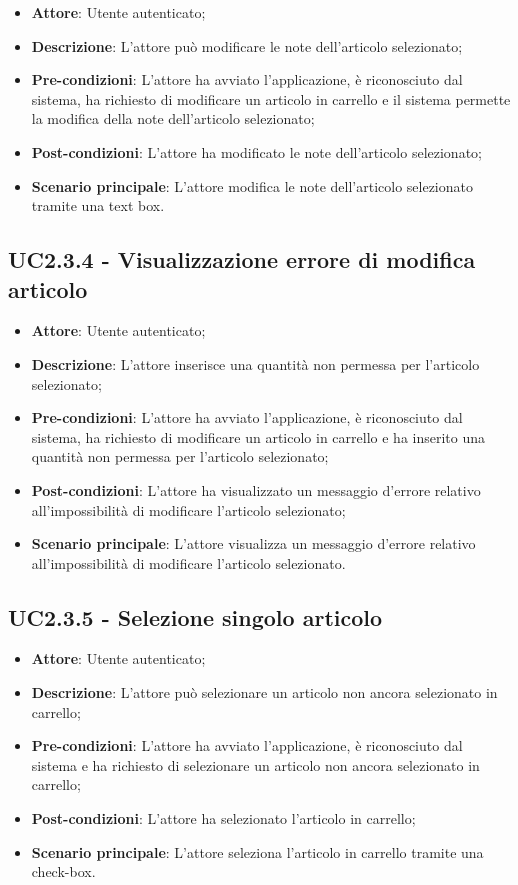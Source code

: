 \begin{itemize}
	\item \textbf{Attore}: Utente autenticato;
	\item \textbf{Descrizione}: L'attore può modificare le note dell'articolo selezionato;
	\item \textbf{Pre-condizioni}: L'attore ha avviato l'applicazione, è riconosciuto dal sistema, ha richiesto di modificare un articolo in carrello e il sistema permette la modifica della note dell'articolo selezionato;
	\item \textbf{Post-condizioni}: L'attore ha modificato le note dell'articolo selezionato;
	\item \textbf{Scenario principale}: L'attore modifica le note dell'articolo selezionato tramite una text box.
\end{itemize}

\subsection{UC2.3.4 - Visualizzazione errore di modifica articolo}

\begin{itemize}
	\item \textbf{Attore}: Utente autenticato;
	\item \textbf{Descrizione}: L'attore inserisce una quantità non permessa per l'articolo selezionato;
	\item \textbf{Pre-condizioni}: L'attore ha avviato l'applicazione, è riconosciuto dal sistema, ha richiesto di modificare un articolo in carrello e ha inserito una quantità non permessa per l'articolo selezionato;
	\item \textbf{Post-condizioni}: L'attore ha visualizzato un messaggio d'errore relativo all'impossibilità di modificare l'articolo selezionato;
	\item \textbf{Scenario principale}: L'attore visualizza un messaggio d'errore relativo all'impossibilità di modificare l'articolo selezionato.
\end{itemize}

\subsection{UC2.3.5 - Selezione singolo articolo}

\begin{itemize}
	\item \textbf{Attore}: Utente autenticato;
	\item \textbf{Descrizione}: L'attore può selezionare un articolo non ancora selezionato in carrello;
	\item \textbf{Pre-condizioni}: L'attore ha avviato l'applicazione, è riconosciuto dal sistema e ha richiesto di selezionare un articolo non ancora selezionato in carrello;
	\item \textbf{Post-condizioni}: L'attore ha selezionato l'articolo in carrello;
	\item \textbf{Scenario principale}: L'attore seleziona l'articolo in carrello tramite una check-box.
\end{itemize}

